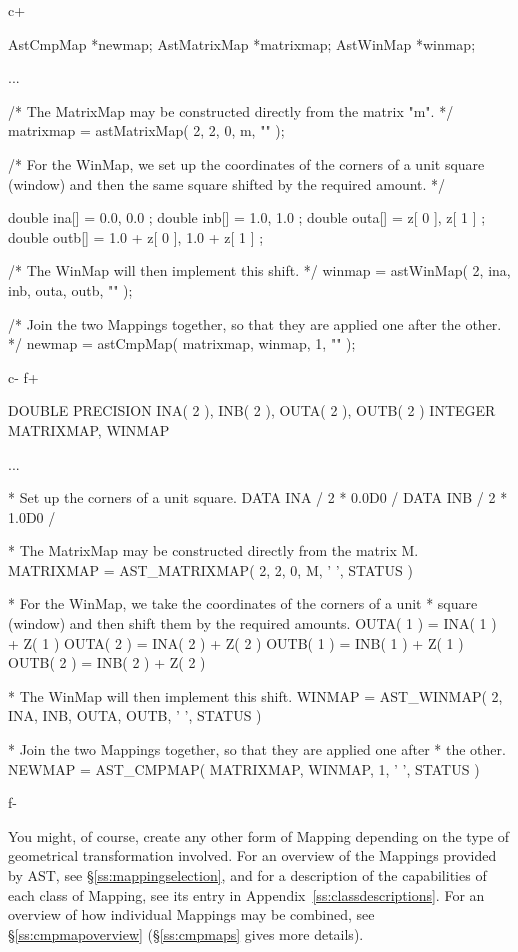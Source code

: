 \documentclass[twoside,11pt]{starlink}
\providecommand{\appref}[1]{Appendix~\ref{#1}}
\providecommand{\secref}[1]{\S\ref{#1}}
\begin{document}
c+
\begin{small}
\begin{terminalv}
AstCmpMap *newmap;
AstMatrixMap *matrixmap;
AstWinMap *winmap;

...

/* The MatrixMap may be constructed directly from the matrix "m". */
matrixmap = astMatrixMap( 2, 2, 0, m, "" );

/* For the WinMap, we set up the coordinates of the corners of a unit
   square (window) and then the same square shifted by the required
   amount. */
{
   double ina[] = { 0.0, 0.0 };
   double inb[] = { 1.0, 1.0 };
   double outa[] = {       z[ 0 ],       z[ 1 ] };
   double outb[] = { 1.0 + z[ 0 ], 1.0 + z[ 1 ] };

/* The WinMap will then implement this shift. */
   winmap = astWinMap( 2, ina, inb, outa, outb, "" );
}

/* Join the two Mappings together, so that they are applied one after
   the other. */
newmap = astCmpMap( matrixmap, winmap, 1, "" );
\end{terminalv}
\end{small}
c-
f+
\begin{small}
\begin{terminalv}
      DOUBLE PRECISION INA( 2 ), INB( 2 ), OUTA( 2 ), OUTB( 2 )
      INTEGER MATRIXMAP, WINMAP

      ...

*  Set up the corners of a unit square.
      DATA INA / 2 * 0.0D0 /
      DATA INB / 2 * 1.0D0 /

*  The MatrixMap may be constructed directly from the matrix M.
      MATRIXMAP = AST_MATRIXMAP( 2, 2, 0, M, ' ', STATUS )

*  For the WinMap, we take the coordinates of the corners of a unit
*  square (window) and then shift them by the required amounts.
      OUTA( 1 ) = INA( 1 ) + Z( 1 )
      OUTA( 2 ) = INA( 2 ) + Z( 2 )
      OUTB( 1 ) = INB( 1 ) + Z( 1 )
      OUTB( 2 ) = INB( 2 ) + Z( 2 )

*  The WinMap will then implement this shift.
      WINMAP = AST_WINMAP( 2, INA, INB, OUTA, OUTB, ' ', STATUS )

*  Join the two Mappings together, so that they are applied one after
*  the other.
      NEWMAP = AST_CMPMAP( MATRIXMAP, WINMAP, 1, ' ', STATUS )
\end{terminalv}
\end{small}
f-

You might, of course, create any other form of Mapping depending on
the type of geometrical transformation involved. For an overview of
the Mappings provided by AST, see \secref{ss:mappingselection}, and
for a description of the capabilities of each class of Mapping, see
its entry in \appref{ss:classdescriptions}. For an overview of how
individual Mappings may be combined, see \secref{ss:cmpmapoverview}
(\secref{ss:cmpmaps} gives more details).
\end{document}

